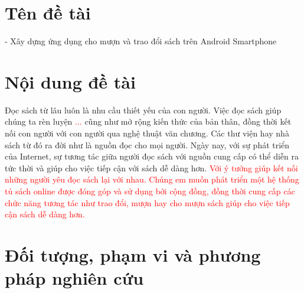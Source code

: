\documentclass[../thesis.tex]{subfiles}
\begin{document}
\section{Tên đề tài}
	- Xây dựng ứng dụng cho mượn và trao đổi sách trên Android Smartphone

\section{Nội dung đề tài}
	Đọc sách từ lâu luôn là nhu cầu thiết yếu của con người. Việc đọc sách giúp chúng ta rèn luyện \textcolor{red}{...} cũng như mở rộng kiến thức của bản thân, đồng thời kết nối con người với con người qua nghệ thuật văn chương. Các thư viện hay nhà sách từ đó ra đời như là nguồn đọc cho mọi người. Ngày nay, với sự phát triển của Internet, sự tương tác giữa người đọc sách với nguồn cung cấp có thể diễn ra tức thời và giúp cho việc tiếp cận với sách dễ dàng hơn. 
	\textcolor{red}{Với ý tưởng giúp kết nối những người yêu đọc sách lại với nhau. Chúng em muốn phát triển một hệ thống tủ sách online được đóng góp và sử dụng bởi cộng đồng, đồng thời cung cấp các chức năng tương tác như trao đổi, mượn hay cho mượn sách giúp cho việc tiếp cận sách dễ dàng hơn.}

\section{Đối tượng, phạm vi và phương pháp nghiên cứu}
\end{document}
